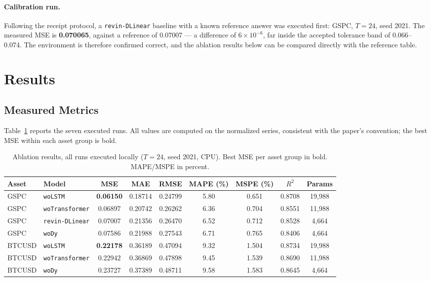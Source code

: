 \documentclass[conference]{IEEEtran}
\begin{document}
\paragraph{Calibration run.} Following the receipt protocol, a
\texttt{revin-DLinear} baseline with a known reference answer was executed
first: GSPC, $T{=}24$, seed 2021. The measured MSE is
\textbf{0.070065}, against a reference of 0.07007 --- a difference of
$6\times10^{-6}$, far inside the accepted tolerance band of 0.066--0.074.
The environment is therefore confirmed correct, and the ablation results
below can be compared directly with the reference table.

\section{Results}
\label{sec:results}

\subsection{Measured Metrics}

Table~\ref{tab:main} reports the seven executed runs. All values are
computed on the normalized series, consistent with the paper's convention;
the best MSE within each asset group is bold.

\begin{table}[!t]
\centering
\caption{Ablation results, all runs executed locally ($T{=}24$, seed 2021,
CPU). Best MSE per asset group in bold. MAPE/MSPE in percent.}
\label{tab:main}
\small
\begin{tabular}{llccccccc}
\toprule
Asset & Model & MSE & MAE & RMSE & MAPE (\%) & MSPE (\%) & $R^2$ & Params \\
\midrule
GSPC   & \texttt{woLSTM}        & \textbf{0.06150} & 0.18714 & 0.24799 & 5.80 & 0.651 & 0.8708 & 19{,}988 \\
GSPC   & \texttt{woTransformer} & 0.06897 & 0.20742 & 0.26262 & 6.36 & 0.704 & 0.8551 & 11{,}988 \\
GSPC   & \texttt{revin-DLinear} & 0.07007 & 0.21356 & 0.26470 & 6.52 & 0.712 & 0.8528 & 4{,}664 \\
GSPC   & \texttt{woDy}          & 0.07586 & 0.21988 & 0.27543 & 6.71 & 0.765 & 0.8406 & 4{,}664 \\
\midrule
BTCUSD & \texttt{woLSTM}        & \textbf{0.22178} & 0.36189 & 0.47094 & 9.32 & 1.504 & 0.8734 & 19{,}988 \\
BTCUSD & \texttt{woTransformer} & 0.22942 & 0.36869 & 0.47898 & 9.45 & 1.539 & 0.8690 & 11{,}988 \\
BTCUSD & \texttt{woDy}          & 0.23727 & 0.37389 & 0.48711 & 9.58 & 1.583 & 0.8645 & 4{,}664 \\
\bottomrule
\end{tabular}
\end{table}
\end{document}
